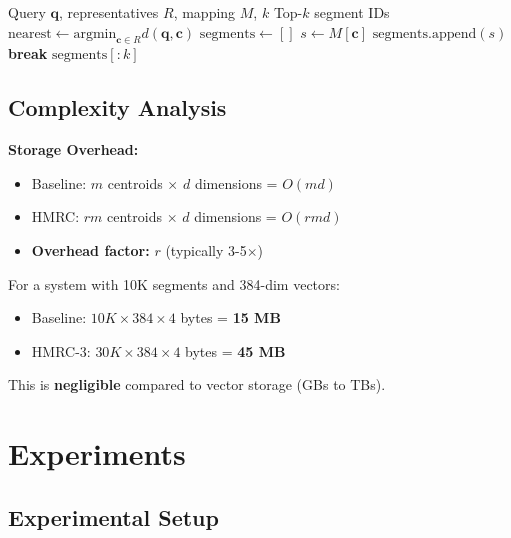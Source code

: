 \documentclass[sigconf, nonacm]{acmart}
\begin{document}
\begin{algorithm}[h]
\caption{HMRC Query Routing}
\label{alg:route}
\begin{algorithmic}[1]
\REQUIRE Query $\mathbf{q}$, representatives $R$, mapping $M$, $k$
\ENSURE Top-$k$ segment IDs
\STATE $\text{nearest} \leftarrow \text{argmin}_{\mathbf{c} \in R} d(\mathbf{q}, \mathbf{c})$ 
\STATE $\text{segments} \leftarrow []$
    \STATE $s \leftarrow M[\mathbf{c}]$
        \STATE $\text{segments}.\text{append}(s)$
    \ENDIF
        \STATE \textbf{break}
    \ENDIF
\ENDFOR
\RETURN $\text{segments}[:k]$
\end{algorithmic}
\end{algorithm}

\subsection{Complexity Analysis}

\textbf{Storage Overhead:}
\begin{itemize}
    \item Baseline: $m$ centroids $\times$ $d$ dimensions = $O(md)$
    \item HMRC: $rm$ centroids $\times$ $d$ dimensions = $O(rmd)$
    \item \textbf{Overhead factor:} $r$ (typically 3-5$\times$)
\end{itemize}

For a system with 10K segments and 384-dim vectors:
\begin{itemize}
    \item Baseline: $10K \times 384 \times 4$ bytes = \textbf{15 MB}
    \item HMRC-3: $30K \times 384 \times 4$ bytes = \textbf{45 MB}
\end{itemize}

This is \textbf{negligible} compared to vector storage (GBs to TBs).


\section{Experiments}
\label{sec:experiments}

\subsection{Experimental Setup}
\end{document}
